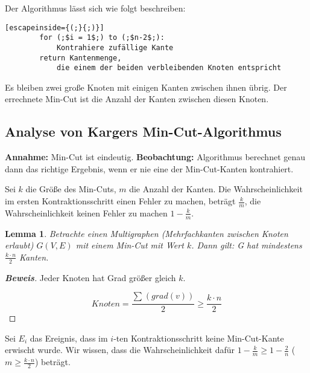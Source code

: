 \documentclass{scrartcl}%
\newtheorem{theorem}{Lemma}
\begin{document}
    Der Algorithmus lässt sich wie folgt beschreiben:

    \begin{lstlisting}[escapeinside={(;}{;)}]
        for (;$i = 1$;) to (;$n-2$;):
            Kontrahiere zufällige Kante
        return Kantenmenge,
            die einem der beiden verbleibenden Knoten entspricht
    \end{lstlisting}

    Es bleiben zwei große Knoten mit einigen Kanten zwischen ihnen übrig.
    Der errechnete Min-Cut ist die Anzahl der Kanten zwischen diesen Knoten.

    \subsection*{Analyse von Kargers Min-Cut-Algorithmus}\label{subsec:analyseVonKargersMincut-algorithmus}

    \textbf{\textsf{Annahme:}}  Min-Cut ist eindeutig.
    \newline
    \textbf{\textsf{Beobachtung:}} Algorithmus berechnet genau dann das richtige Ergebnis, wenn er nie eine der Min-Cut-Kanten kontrahiert.

    Sei $k$ die Größe des Min-Cuts, $m$ die Anzahl der Kanten.
    Die Wahrscheinlichkeit im ersten Kontraktionsschritt einen Fehler zu machen, beträgt $\frac{k}{m}$,
    die Wahrscheinlichkeit keinen Fehler zu machen $1-\frac{k}{m}$.

    \begin{theorem}
        Betrachte einen Multigraphen (Mehrfachkanten zwischen Knoten erlaubt) $G(V,E)$ mit einem Min-Cut mit Wert $k$.
        Dann gilt: G hat mindestens $\frac{k \cdot n}{2}$ Kanten.
    \end{theorem}

    \begin{proof}[\textbf{Beweis}]
        Jeder Knoten hat Grad größer gleich $k$.

        \begin{equation*}
            Knoten = \frac{\sum_{}^{}(grad(v))}{2} \geq \frac{k \cdot n}{2}
        \end{equation*}
    \end{proof}

    Sei $E_i$ das Ereignis, dass im $i$-ten Kontraktionsschritt keine Min-Cut-Kante erwischt wurde.
    Wir wissen, dass die Wahrscheinlichkeit dafür $1-\frac{k}{m} \geq 1 - \frac{2}{n}$
    ($m \geq \frac{k \cdot n}{2}$) beträgt.
\end{document}
